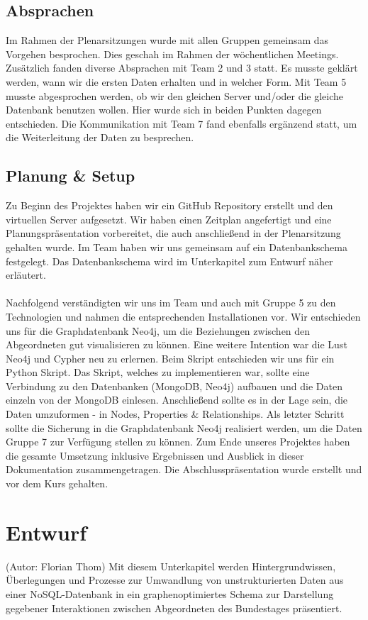 \subsection{Absprachen}
Im Rahmen der Plenarsitzungen wurde mit allen Gruppen gemeinsam das Vorgehen besprochen. Dies geschah im Rahmen der wöchentlichen Meetings. Zusätzlich fanden diverse Absprachen mit Team 2 und 3 statt. Es musste geklärt werden, wann wir die ersten Daten erhalten und in welcher Form. Mit Team 5 musste abgesprochen werden, ob wir den gleichen Server und/oder die gleiche Datenbank benutzen wollen. Hier wurde sich in beiden Punkten dagegen entschieden. Die Kommunikation mit Team 7 fand ebenfalls ergänzend statt, um die Weiterleitung der Daten zu besprechen.
\subsection{Planung \& Setup}
Zu Beginn des Projektes haben wir ein GitHub Repository erstellt und den virtuellen Server aufgesetzt. Wir haben einen Zeitplan angefertigt und eine Planungspräsentation vorbereitet, die auch anschließend in der Plenarsitzung gehalten wurde. Im Team haben wir uns gemeinsam auf ein Datenbankschema festgelegt. Das Datenbankschema wird im Unterkapitel zum Entwurf näher erläutert.\\
\\
Nachfolgend verständigten wir uns im Team und auch mit Gruppe 5 zu den Technologien und nahmen die entsprechenden Installationen vor. Wir entschieden uns für die Graphdatenbank Neo4j, um die Beziehungen zwischen den Abgeordneten gut visualisieren zu können. Eine weitere Intention war die Lust Neo4j und Cypher neu zu erlernen. Beim Skript entschieden wir uns für ein Python Skript. Das Skript, welches zu implementieren war, sollte eine Verbindung zu den Datenbanken (MongoDB, Neo4j) aufbauen und die Daten einzeln von der MongoDB einlesen. Anschließend sollte es in der Lage sein, die Daten umzuformen - in Nodes, Properties & Relationships. Als letzter Schritt sollte die Sicherung in die Graphdatenbank Neo4j realisiert werden, um die Daten Gruppe 7 zur Verfügung stellen zu können. Zum Ende unseres Projektes haben die gesamte Umsetzung inklusive Ergebnissen und Ausblick in dieser Dokumentation zusammengetragen. Die Abschlusspräsentation wurde erstellt und vor dem Kurs gehalten.
\section{Entwurf}
(Autor: Florian Thom)
\newline
\newline
Mit diesem Unterkapitel werden Hintergrundwissen, Überlegungen und Prozesse zur Umwandlung von unstrukturierten Daten aus einer NoSQL-Daten\-bank in ein graphenoptimiertes Schema zur Darstellung gegebener Interaktionen zwischen Abgeordneten des Bundestages präsentiert.
